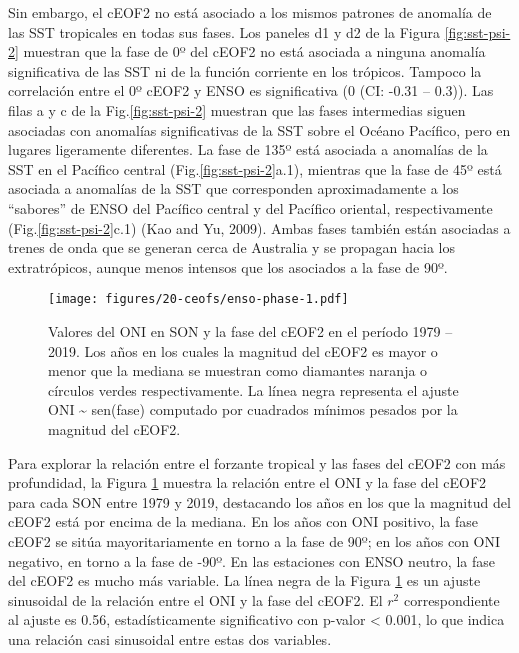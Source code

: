 \documentclass[12pt,oneside]{reedthesis}
\begin{document}
Sin embargo, el cEOF2 no está asociado a los mismos patrones de anomalía de las SST tropicales en todas sus fases.
Los paneles d1 y d2 de la Figura \ref{fig:sst-psi-2} muestran que la fase de 0º del cEOF2 no está asociada a ninguna anomalía significativa de las SST ni de la función corriente en los trópicos.
Tampoco la correlación entre el 0º cEOF2 y ENSO es significativa (0 (CI: -0.31 -- 0.3)).
Las filas a y c de la Fig.\ref{fig:sst-psi-2} muestran que las fases intermedias siguen asociadas con anomalías significativas de la SST sobre el Océano Pacífico, pero en lugares ligeramente diferentes.
La fase de 135º está asociada a anomalías de la SST en el Pacífico central (Fig.\ref{fig:sst-psi-2}a.1), mientras que la fase de 45º está asociada a anomalías de la SST que corresponden aproximadamente a los ``sabores'' de ENSO del Pacífico central y del Pacífico oriental, respectivamente (Fig.\ref{fig:sst-psi-2}c.1) (Kao and Yu, 2009).
Ambas fases también están asociadas a trenes de onda que se generan cerca de Australia y se propagan hacia los extratrópicos, aunque menos intensos que los asociados a la fase de 90º.




\begin{figure}
\centering
\texttt{[image: figures/20-ceofs/enso-phase-1.pdf]}
\caption{\label{fig:enso-phase}Valores del ONI en SON y la fase del cEOF2 en el período 1979 -- 2019.
Los años en los cuales la magnitud del cEOF2 es mayor o menor que la mediana se muestran como diamantes naranja o círculos verdes respectivamente.
La línea negra representa el ajuste ONI \textasciitilde{} sen(fase) computado por cuadrados mínimos pesados por la magnitud del cEOF2.}
\end{figure}
Para explorar la relación entre el forzante tropical y las fases del cEOF2 con más profundidad, la Figura \ref{fig:enso-phase} muestra la relación entre el ONI y la fase del cEOF2 para cada SON entre 1979 y 2019, destacando los años en los que la magnitud del cEOF2 está por encima de la mediana.
En los años con ONI positivo, la fase cEOF2 se sitúa mayoritariamente en torno a la fase de 90º; en los años con ONI negativo, en torno a la fase de -90º.
En las estaciones con ENSO neutro, la fase del cEOF2 es mucho más variable.
La línea negra de la Figura \ref{fig:enso-phase} es un ajuste sinusoidal de la relación entre el ONI y la fase del cEOF2.
El \(r^2\) correspondiente al ajuste es 0.56, estadísticamente significativo con p-valor \textless{} 0.001, lo que indica una relación casi sinusoidal entre estas dos variables.
\end{document}

